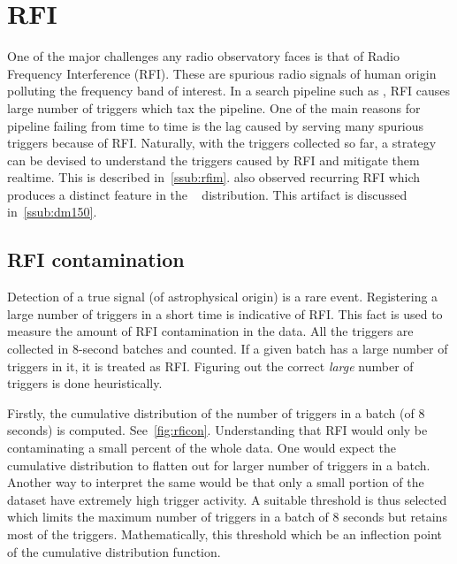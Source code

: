 \section {RFI}
\label{sec:RFI}

\par One of the major challenges any radio observatory faces is that of Radio Frequency Interference (RFI). 
These are spurious radio signals of human origin polluting the frequency band of interest. In a search pipeline such as \vf, 
RFI causes large number of triggers which tax the pipeline. 
One of the main reasons for \vf pipeline failing from time to time is the lag caused by serving many spurious triggers because of RFI.
Naturally, with the triggers collected so far, a strategy can be devised to understand the triggers caused by RFI and mitigate them realtime.
This is described in~\autoref{ssub:rfim}. \vfpfs also observed recurring RFI which produces a distinct feature in the \dm~ distribution. This artifact is discussed in~\autoref{ssub:dm150}.

\subsection {RFI contamination}
\label{ssub:rfim}

\par Detection of a true signal (of astrophysical origin) is a rare event. Registering a large number of triggers in a short time is indicative of RFI.
This fact is used to measure the amount of RFI contamination in the \vfpfs data.
All the triggers are collected in $8$-second batches and counted.
If a given batch has a large number of triggers in it, it is treated as RFI.
Figuring out the correct \emph{large} number of triggers is done heuristically.

\par Firstly, the cumulative distribution of the number of triggers in a batch (of $8$ seconds) is computed. See~\autoref{fig:rficon}.
Understanding that RFI would only be contaminating a small percent of the whole data. 
One would expect the cumulative distribution to flatten out for larger number of triggers in a batch.
Another way to interpret the same would be that only a small portion of the dataset have extremely high trigger activity.
A suitable threshold is thus selected which limits the maximum number of triggers in a batch of $8$ seconds but retains most of the triggers.
Mathematically, this threshold which be an inflection point of the cumulative distribution function.

